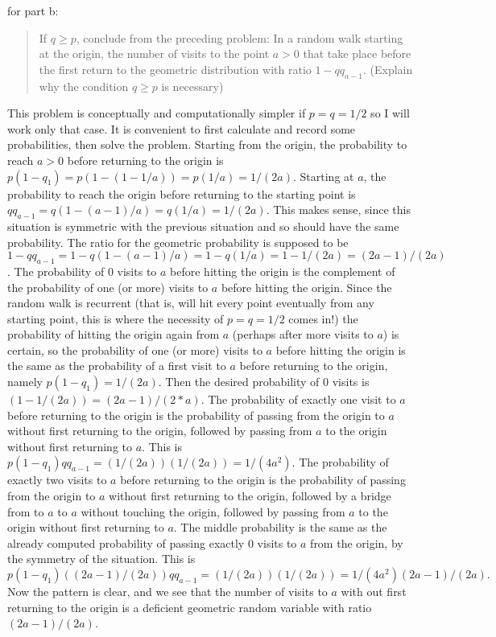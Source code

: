 \begin{solution}
\begin{solution}
\begin{solution}
\begin{solution}
\begin{solution}
\begin{solution}
\begin{solution}
\begin{solution}
{\begin{solution}
for part b:
\begin{quote}
  If $q \ge p$, conclude from the preceding problem:  In a random
  walk starting at the origin, the number of visits to the point
  $a > 0$ that take place before the first return to the
  geometric distribution with ratio $1 - q q_{a-1}$.  
  (Explain why the condition $q \ge p$ is necessary)
\end{quote}

This problem is conceptually and computationally simpler if $p
= q = 1/2$ so I will work only that case.   
It is convenient to first calculate and record 
some probabilities, then solve the problem.
Starting from the origin, the probability to reach $a>0$ before
returning to the origin is $p (1-q_1) = p ( 1 - (1 - 1/a)) =
p (1/a) = 1/(2a)$.
Starting at $a$, the probability to reach the origin before
returning to the starting point is $q q_{a-1} = q ( 1 - (a-1)/a)
= q (1/a) = 1/(2a)$.  This makes sense, since this situation is
symmetric with the previous situation and so should have the
same probability.
The ratio for the geometric probability is supposed to be $1 -
q q_{a-1} = 1 - q (1 - (a-1)/a) = 1 - q (1/a) = 1 - 1/(2a) =
(2a-1)/(2a)$.    
The probability of $0$ visits to $a$ before hitting the
origin is the complement of the probability of one (or more)
visits to $a$ before hitting the origin.  Since the random
walk is recurrent (that is, will hit every point eventually
from any starting point, this is where the necessity of $p = q
=1/2$ comes in!) the probability of hitting the origin again
from $a$ (perhaps after more visits to $a$) is certain, so the
probability of one (or more) visits to $a$ before hitting the
origin is the same as the probability of a first visit to $a$
before returning to the origin,
namely $p (1-q_1) = 1/(2 a)$.  Then the desired probability of $0$
visits is $(1 - 1/(2a)) = (2a-1)/(2*a)$.
The probability of exactly one visit to $a$ before returning to
the origin is the
probability of passing from the origin to $a$ without first
returning to the origin, followed by passing from $a$ to the
origin without first returning to $a$.  This is
$p (1-q_1) q q_{a-1} = ( 1/(2 a) ) ( 1/(2 a) ) = 1/(4 a^2)$.
The probability of exactly two visits to $a$ before
returning to the origin is the
probability of passing from the origin to $a$ without first
returning to the origin, followed by a bridge from to $a$ to $a$
without touching the origin, followed by passing from $a$ to the
origin without first returning to $a$.  The middle probability
is the same as the already computed probability of passing
exactly $0$ visits to $a$ from the origin, by the symmetry of the
situation.  This is
\[
  p (1-q_1) ( (2 a-1)/(2 a) )   q q_{a-1} = ( 1/(2 a) ) (
  1/(2 a) ) = 1/(4 a^2) (2 a-1)/(2 a).
\]
Now the pattern is clear, and we see that the number of visits
to $a$ with out first returning to the origin is a deficient geometric
random variable with ratio $(2a-1)/(2a)$.  


\end{solution}}
\end{solution}
\end{solution}
\end{solution}
\end{solution}
\end{solution}
\end{solution}
\end{solution}
\end{solution}
